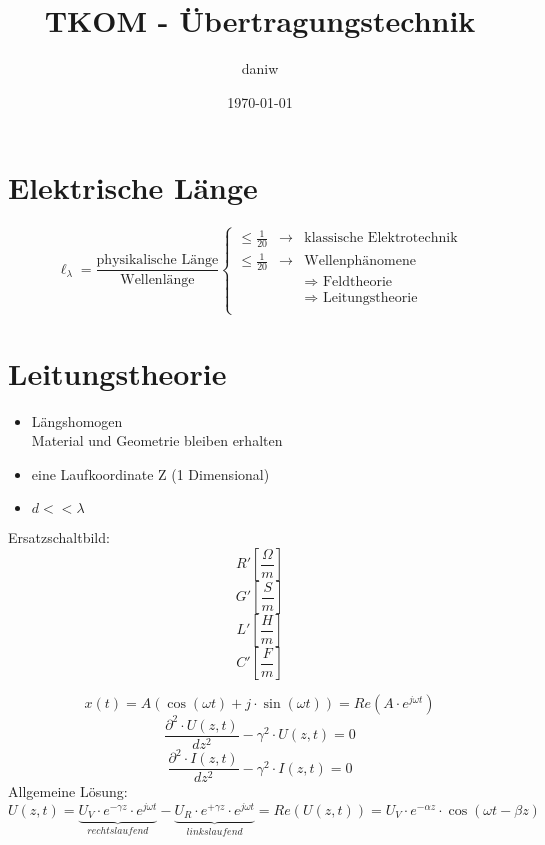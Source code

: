 \documentclass[a4paper, 10pt, fleqn]{article}
\title{TKOM - Übertragungstechnik}
\author{daniw}
\date{\today}
\begin{document}
\maketitle

\clearpage

\tableofcontents

\clearpage

\section{Elektrische Länge}
\[ \ell_\lambda = \frac{\text{physikalische Länge}}{\text{Wellenlänge}} \left\{
\begin{array}{lcl}
\leq \frac{1}{20} & \to & \text{klassische Elektrotechnik} \\
\leq \frac{1}{20} & \to & \text{Wellenphänomene} \\
                  &     & \text{$\Rightarrow$ Feldtheorie} \\
                  &     & \text{$\Rightarrow$ Leitungstheorie} \\
\end{array}
\right. \]

\section{Leitungstheorie}
\begin{itemize}
    \item Längshomogen \\
        Material und Geometrie bleiben erhalten
    \item eine Laufkoordinate Z (1 Dimensional)
    \item $d << \lambda$
\end{itemize}

Ersatzschaltbild: 
\[ R' \left[\frac{\Omega}{m}\right] \]
\[ G' \left[\frac{S}{m}\right] \]
\[ L' \left[\frac{H}{m}\right] \]
\[ C' \left[\frac{F}{m}\right] \]

\[ x(t) = A (\cos(\omega t) + j \cdot \sin(\omega t)) = Re(A \cdot e^{j \omega t}) \]
\[ \frac{\partial^2 \cdot  U(z, t)}{dz^2} - \gamma^2 \cdot U(z, t) = 0 \]
\[ \frac{\partial^2 \cdot  I(z, t)}{dz^2} - \gamma^2 \cdot I(z, t) = 0 \]
Allgemeine Lösung: 
\[ 
    U(z, t) 
    = \underbrace{U_V \cdot e^{-\gamma z} \cdot e^{j \omega t}}_{rechtslaufend} 
    - \underbrace{U_R \cdot e^{+\gamma z} \cdot e^{j \omega t}}_{linkslaufend} 
    = Re(U(z, t)) 
    = U_V \cdot e^{-\alpha z} \cdot \cos(\omega t - \beta z) 
\]
\end{document}
